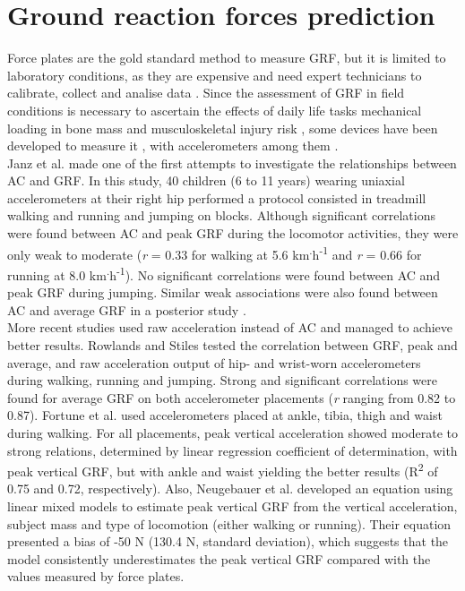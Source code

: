 \documentclass[11pt]{article}
\begin{document}
\section*{Ground reaction forces prediction}

Force plates are the gold standard method to measure GRF, but it is limited to laboratory conditions, as they are expensive and need expert technicians to calibrate, collect and analise data \cite{Medved_2000}. Since the assessment of GRF in field conditions is necessary to ascertain the effects of daily life tasks mechanical loading in bone mass and musculoskeletal injury risk \cite{Turner_2003, Marques_2012, Martyn-StJames_2010}, some devices have been developed to measure it \cite{Liu_2010, Koch_2016}, with accelerometers among them \cite{Fortune_2014, Neugebauer_2012, Neugebauer_2014, Neugebauer_2018}. \\

Janz et al. \citeyear{Janz_2003} made one of the first attempts to investigate the relationships between AC and GRF. In this study, 40 children (6 to 11 years) wearing uniaxial accelerometers at their right hip performed a protocol consisted in treadmill walking and running and jumping on blocks. Although significant correlations were found between AC and peak GRF during the locomotor activities, they were only weak to moderate (\textit{r} = 0.33 for walking at  5.6 km\textsuperscript{.}h\textsuperscript{-1} and \textit{r} = 0.66 for running at 8.0 km\textsuperscript{.}h\textsuperscript{-1}). No significant correlations were found between AC and peak GRF during jumping. Similar weak associations were also found between AC and average GRF in a posterior study \cite{Garcia_2004}. \\

More recent studies used raw acceleration instead of AC and managed to achieve better results. Rowlands and Stiles \citeyear{Rowlands_2012} tested the correlation between GRF, peak and average, and raw acceleration output of hip- and wrist-worn accelerometers during walking, running and jumping. Strong and significant correlations were found for average GRF on both accelerometer placements (\textit{r} ranging from 0.82 to 0.87). Fortune et al. \cite{Fortune_2014} used accelerometers placed at ankle, tibia, thigh and waist during walking. For all placements, peak vertical acceleration showed moderate to strong relations, determined by linear regression coefficient of determination, with peak vertical GRF, but with ankle and waist yielding the better results (R\textsuperscript{2} of 0.75 and 0.72, respectively). Also, Neugebauer et al. \citeyear{Neugebauer_2014} developed an equation using linear mixed models to estimate peak vertical GRF from the vertical acceleration, subject mass and type of locomotion (either walking or running). Their equation presented a bias of -50 N (130.4 N, standard deviation), which suggests that the model consistently underestimates the peak vertical GRF compared with the values measured by force plates. 

\pagebreak



\end{document}
